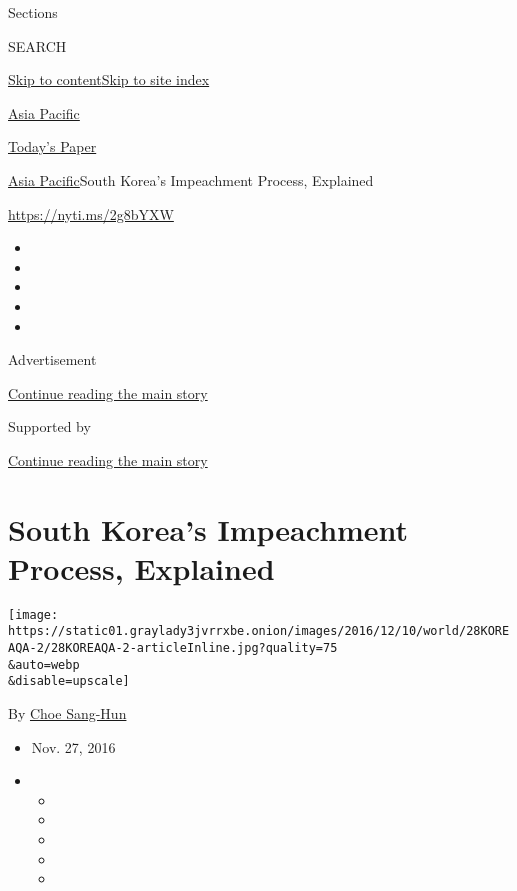 Sections

SEARCH

\protect\hyperlink{site-content}{Skip to
content}\protect\hyperlink{site-index}{Skip to site index}

\href{https://www.nytimes3xbfgragh.onion/section/world/asia}{Asia
Pacific}

\href{https://myaccount.nytimes3xbfgragh.onion/auth/login?response_type=cookie\&client_id=vi}{}

\href{https://www.nytimes3xbfgragh.onion/section/todayspaper}{Today's
Paper}

\href{/section/world/asia}{Asia Pacific}\textbar{}South Korea's
Impeachment Process, Explained

\url{https://nyti.ms/2g8bYXW}

\begin{itemize}
\item
\item
\item
\item
\item
\end{itemize}

Advertisement

\protect\hyperlink{after-top}{Continue reading the main story}

Supported by

\protect\hyperlink{after-sponsor}{Continue reading the main story}

\hypertarget{south-koreas-impeachment-process-explained}{%
\section{South Korea's Impeachment Process,
Explained}\label{south-koreas-impeachment-process-explained}}

\texttt{[image: https://static01.graylady3jvrrxbe.onion/images/2016/12/10/world/28KOREAQA-2/28KOREAQA-2-articleInline.jpg?quality=75\\\&auto=webp\\\&disable=upscale]}

By \href{http://www.nytimes3xbfgragh.onion/by/choe-sang-hun}{Choe
Sang-Hun}

\begin{itemize}
\item
  Nov. 27, 2016
\item
  \begin{itemize}
  \item
  \item
  \item
  \item
  \item
  \end{itemize}
\end{itemize}

